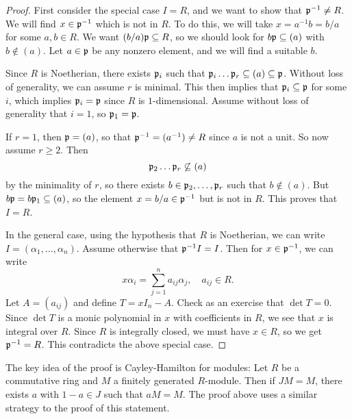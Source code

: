 \begin{proof}
  First consider the special case $I = R$, and we
  want to show that $\mathfrak{p}^{-1} \ne R$. We will find
  $x \in \mathfrak{p}^{-1}$ which is not in $R$. To do this,
  we will take $x = a^{-1} b = b / a$ for some $a, b \in R$.
  We want $(b / a) \mathfrak{p} \subseteq R$, so we should look
  for $b \mathfrak{p} \subseteq (a)$ with $b \notin (a)$.
  Let $a \in \mathfrak{p}$ be any nonzero element, and
  we will find a suitable $b$.

  Since $R$ is Noetherian, there exists $\mathfrak{p}_i$ such that
  $\mathfrak{p}_i \dots \mathfrak{p}_r \subseteq (a) \subseteq \mathfrak{p}$.
  Without loss of generality, we can assume $r$ is minimal.
  This then implies that $\mathfrak{p}_i \subseteq \mathfrak{p}$ for
  some $i$, which implies $\mathfrak{p}_i = \mathfrak{p}$ since
  $R$ is $1$-dimensional. Assume without loss of
  generality that $i = 1$, so $\mathfrak{p}_1 = \mathfrak{p}$.

  If $r = 1$, then $\mathfrak{p} = (a)$, so that
  $\mathfrak{p}^{-1} = (a^{-1}) \ne R$ since $a$ is not a unit.
  So now assume $r \ge 2$. Then
  \[
    \mathfrak{p}_2 \dots \mathfrak{p}_r \not\subseteq (a)
  \]
  by the minimality of $r$, so there exists
  $b \in \mathfrak{p}_2, \dots, \mathfrak{p}_r$ such that $b \notin (a)$.
  But $b \mathfrak{p} = b \mathfrak{p}_1 \subseteq (a)$, so the element
  $x = b / a \in \mathfrak{p}^{-1}$
  but is not in $R$. This proves that $I = R$.

  In the general case, using the hypothesis that $R$
  is Noetherian, we can write $I = (\alpha_1, \dots, \alpha_n)$.
  Assume otherwise that $\mathfrak{p}^{-1} I = I$.
  Then for $x \in \mathfrak{p}^{-1}$, we can write
  \[
    x \alpha_i = \sum_{j = 1}^n a_{ij} \alpha_j,
    \quad a_{ij} \in R.
  \]
  Let $A = (a_{ij})$ and define
  $T = x I_n - A$. Check as an exercise that
  $\det T = 0$. Since $\det T$ is a monic polynomial
  in $x$ with coefficients in $R$, we see that
  $x$ is integral over $R$. Since $R$ is integrally
  closed, we must have $x \in R$, so we get
  $\mathfrak{p}^{-1} = R$. This contradicts the above special
  case.
\end{proof}

\begin{remark}
  The key idea of the proof is Cayley-Hamilton for
  modules: Let $R$ be a commutative ring and $M$ a
  finitely generated $R$-module. Then if
  $JM = M$, there exists $a$ with $1 - a \in J$
  such that $aM = M$. The proof above uses a similar
  strategy to the proof of this statement.
\end{remark}
